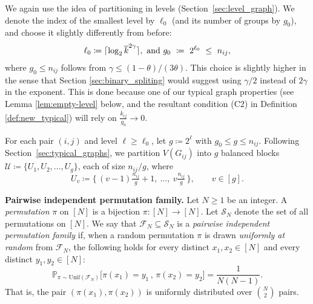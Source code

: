 \documentclass[journal]{IEEEtran}
\theoremstyle{definition}
\theoremstyle{definition}
\newcommand{\PP}{\mathbb{P}}
\newcommand{\kb}{\overline{k}}
\DeclarePairedDelimiter\ceil{\lceil}{\rceil}
\begin{document}
We again use the idea of partitioning in levels (Section~\ref{sec:level_graph}).  We denote the index of the smallest level by $\ell_0$ (and its number of groups by $g_0$), and choose it slightly differently from before:
\begin{align}
\ell_0\coloneqq \ceil{\log_2 \kb^{2\gamma}}, \text{ and } g_0\ \coloneqq\ 2^{\ell_0} \ \le\ n_{ij}, \label{eq:new_l0}
\end{align}
where \(g_0\le n_{ij}\) follows from \(\gamma\le (1-\theta)/(3\theta)\).  This choice is slightly higher in the sense that Section \ref{sec:binary_spliting} would suggest using $\gamma/2$ instead of $2\gamma$ in the exponent.  This is done because one of our typical graph properties (see Lemma \ref{lem:empty-level} below, and the resultant condition (C2) in Definition \ref{def:new_typical}) will rely on $\frac{\kb_{ij}}{g_0} \to 0$.

For each pair \((i,j)\) and level \(\ell \geq \ell_0\), let \(g \coloneqq 2^{\ell}\) with \(g_0 \le g \le n_{ij}\).
Following Section~\ref{sec:typical_graphs}, we partition \(V(G_{ij})\) into \(g\) balanced blocks
\(\mathcal{U}\coloneqq\{U_1,U_2,\dots,U_g\}\), each of size \(n_{ij}/g\), where
\[
  U_v \coloneqq \big\{\, (v-1)\tfrac{n_{ij}}{g}+1,\ \dots,\ v\tfrac{n_{ij}}{g} \,\big\},
  \qquad v \in [g].
\]

\textbf{Pairwise independent permutation family.} Let $N \ge 1$ be an integer. A \emph{permutation} $\pi$ on $[N]$ is a bijection $\pi:[N]\to[N]$. Let $\mathcal{S}_N$ denote the set of all permutations on $[N]$. We say that $\mathcal{F}_N \subseteq \mathcal{S}_N$ is a \emph{pairwise independent permutation family} if, when a random permutation $\pi$ is drawn \emph{uniformly at random} from $\mathcal{F}_N$, the following holds for every distinct $x_1,x_2\in[N]$ and every distinct $y_1,y_2\in[N]$:
\[
  \PP_{\pi\sim \mathrm{Unif}(\mathcal{F}_N)} \big[\pi(x_1)=y_1 \, , \, \pi(x_2)=y_2\big]
  = \frac{1}{N(N-1)}.
\]
That is, the pair $(\pi(x_{1}),\pi(x_{2}))$ is uniformly distributed over  $\binom{N}{2}$ pairs.
\end{document}
